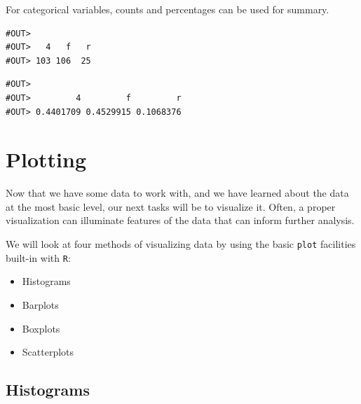 \documentclass[]{book}
\newenvironment{Shaded}{\begin{snugshade}}{\end{snugshade}}
\newcommand{\KeywordTok}[1]{\textcolor[rgb]{0.13,0.29,0.53}{\textbf{#1}}}
\newcommand{\StringTok}[1]{\textcolor[rgb]{0.31,0.60,0.02}{#1}}
\newcommand{\OperatorTok}[1]{\textcolor[rgb]{0.81,0.36,0.00}{\textbf{#1}}}
\newcommand{\NormalTok}[1]{#1}
\providecommand{\tightlist}{%
  \setlength{\itemsep}{0pt}\setlength{\parskip}{0pt}}
\begin{document}
For categorical variables, counts and percentages can be used for
summary.

\begin{Shaded}
\end{Shaded}

\begin{verbatim}
#OUT> 
#OUT>   4   f   r 
#OUT> 103 106  25
\end{verbatim}

\begin{Shaded}
\end{Shaded}

\begin{verbatim}
#OUT> 
#OUT>         4         f         r 
#OUT> 0.4401709 0.4529915 0.1068376
\end{verbatim}

\section{Plotting}\label{plotting}

Now that we have some data to work with, and we have learned about the
data at the most basic level, our next tasks will be to visualize it.
Often, a proper visualization can illuminate features of the data that
can inform further analysis.

We will look at four methods of visualizing data by using the basic
\texttt{plot} facilities built-in with \texttt{R}:

\begin{itemize}
\tightlist
\item
  Histograms
\item
  Barplots
\item
  Boxplots
\item
  Scatterplots
\end{itemize}

\subsection{Histograms}\label{histograms}
\end{document}
